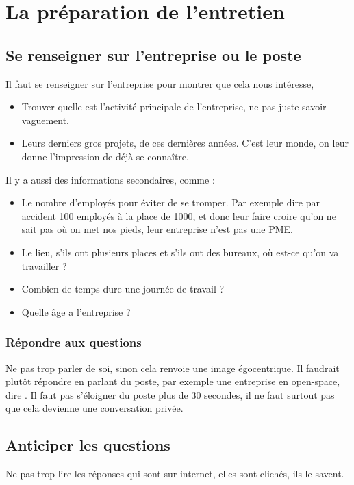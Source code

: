 \section{La préparation de l'entretien}
\subsection{Se renseigner sur l'entreprise ou le poste}

Il faut se renseigner sur l'entreprise pour montrer que cela nous intéresse, 

\begin{itemize}
    \item Trouver quelle est l'activité principale de l'entreprise, ne pas juste savoir vaguement.
    \item Leurs derniers gros projets, de ces dernières années. C'est leur monde, on leur donne l'impression de déjà se connaître.
\end{itemize}

Il y a aussi des informations secondaires, comme :
\begin{itemize}
    \item Le nombre d'employés pour éviter de se tromper. Par exemple dire par accident 100 employés à la place de 1000, et donc leur faire croire qu'on ne sait pas où on met nos pieds, leur entreprise n'est pas une PME.
    \item Le lieu, s'ils ont plusieurs places et s'ils ont des bureaux, où est-ce qu'on va travailler ?
    \item Combien de temps dure une journée de travail ?
    \item Quelle âge a l'entreprise ?
\end{itemize}

\subsubsection{Répondre aux questions}
Ne pas trop parler de soi, sinon cela renvoie une image égocentrique. Il faudrait plutôt répondre en parlant du poste, par exemple une entreprise en open-space, dire . Il faut pas s'éloigner du poste plus de 30 secondes, il ne faut surtout pas que cela devienne une conversation privée.

\subsection{Anticiper les questions}
Ne pas trop lire les réponses qui sont sur internet, elles sont clichés, ils le savent.

